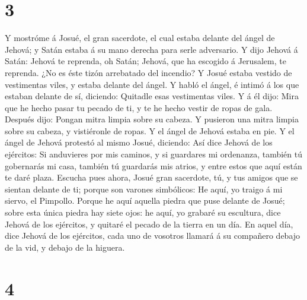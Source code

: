 \hypertarget{section-2}{%
\section{3}\label{section-2}}

 Y mostróme á Josué, el gran sacerdote, el cual estaba
delante del ángel de Jehová; y Satán estaba á su mano derecha para serle
adversario.  Y dijo Jehová á Satán: Jehová te reprenda, oh
Satán; Jehová, que ha escogido á Jerusalem, te reprenda. ¿No es éste
tizón arrebatado del incendio?  Y Josué estaba vestido de
vestimentas viles, y estaba delante del ángel.  Y habló el
ángel, é intimó á los que estaban delante de sí, diciendo: Quitadle esas
vestimentas viles. Y á él dijo: Mira que he hecho pasar tu pecado de ti,
y te he hecho vestir de ropas de gala.  Después dijo: Pongan
mitra limpia sobre su cabeza. Y pusieron una mitra limpia sobre su
cabeza, y vistiéronle de ropas. Y el ángel de Jehová estaba en pie.
 Y el ángel de Jehová protestó al mismo Josué, diciendo:
 Así dice Jehová de los ejércitos: Si anduvieres por mis
caminos, y si guardares mi ordenanza, también tú gobernarás mi casa,
también tú guardarás mis atrios, y entre estos que aquí están te daré
plaza.  Escucha pues ahora, Josué gran sacerdote, tú, y tus
amigos que se sientan delante de ti; porque son varones simbólicos: He
aquí, yo traigo á mi siervo, el Pimpollo.  Porque he aquí
aquella piedra que puse delante de Josué; sobre esta única piedra hay
siete ojos: he aquí, yo grabaré su escultura, dice Jehová de los
ejércitos, y quitaré el pecado de la tierra en un día.  En
aquel día, dice Jehová de los ejércitos, cada uno de vosotros llamará á
su compañero debajo de la vid, y debajo de la higuera.

\hypertarget{section-3}{%
\section{4}\label{section-3}}

